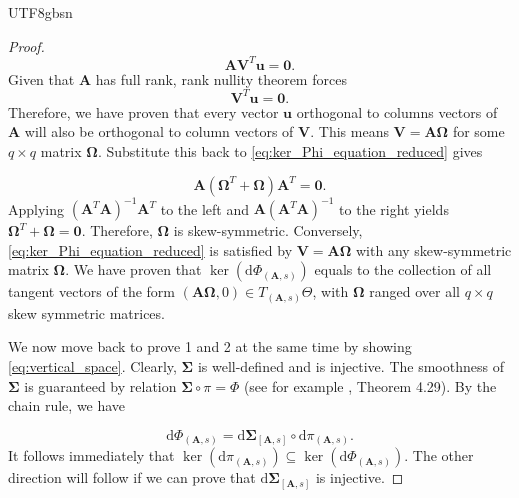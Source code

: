 \documentclass[12pt]{report}
\theoremstyle{plain}
\theoremstyle{definition}
\begin{document}
\begin{CJK*}{UTF8}{gbsn}
\begin{proof}
\begin{equation*}
  \bm{A}\bm{V}^T\bm{u} = \bm{0}.
\end{equation*}
Given that $\bm{A}$ has full rank, 
rank nullity theorem forces 
\begin{equation*}
  \bm{V}^T\bm{u} = \bm{0}.
\end{equation*}
Therefore, we have proven that every vector $\bm{u}$
orthogonal to columns vectors of $\bm{A}$
will also be orthogonal to column vectors of $\bm{V}$.
This means $\bm{V}=\bm{A} \bm{\Omega}$ for some 
$q \times q$ matrix $\bm{\Omega}$.
Substitute this back to \eqref{eq:ker_Phi_equation_reduced}
gives 

\begin{equation*}
  \bm{A}(\bm{\Omega}^T + \bm{\Omega})\bm{A}^T = \bm{0}.
\end{equation*}
Applying $(\bm{A}^T \bm{A})^{-1} \bm{A}^T$ 
to the left and $\bm{A}(\bm{A}^T \bm{A})^{-1}$ to the right 
yields $\bm{\Omega}^T + \bm{\Omega} = \bm{0}$.
Therefore, $\bm{\Omega}$ is skew-symmetric.
Conversely, \eqref{eq:ker_Phi_equation_reduced} 
is satisfied by $\bm{V}=\bm{A} \bm{\Omega}$
with any skew-symmetric matrix $\bm{\Omega}$.
We have proven that $\ker(\mathrm{d}\Phi_{(\bm{A},s)})$
equals to the collection of all tangent vectors 
of the form $(\bm{A} \bm{\Omega}, 0) \in T_{(\bm{A},s)}\Theta$,
with $\bm{\Omega}$ ranged over all $q \times q$ skew symmetric matrices.

We now move back to prove 1 and 2 at the same time
by showing \eqref{eq:vertical_space}.
Clearly, $\bm{\Sigma}$ is well-defined 
and is injective.
The smoothness of $\bm{\Sigma}$
is guaranteed by relation $\bm{\Sigma} \circ \pi = \Phi$
(see for example \citealp{Lee_2013}, Theorem 4.29).
By the chain rule, we have 

\begin{equation} \label{eq:differential_Phi}
  \mathrm{d} \Phi_{(\bm{A},s)} = \mathrm{d} \bm{\Sigma}_{[\bm{A},s]} \circ \mathrm{d} \pi_{(\bm{A},s)}.
\end{equation}
It follows immediately that 
$\ker(\mathrm{d}\pi_{(\bm{A},s)}) \subseteq \ker(\mathrm{d}\Phi_{(\bm{A},s)})$.
The other direction will follow if we can prove that 
$\mathrm{d} \bm{\Sigma}_{[\bm{A},s]}$ is injective.


\end{proof}
\end{CJK*}
\end{document}
